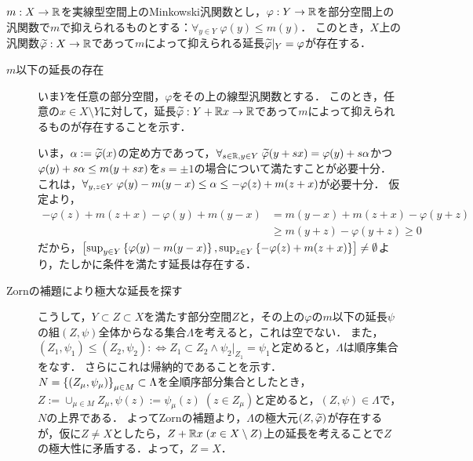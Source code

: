 \documentclass[uplatex,dvipdfmx]{jsreport}
\begin{document}
\begin{lemma}
    $m:X\to\mathbb{R}$を実線型空間上のMinkowski汎関数とし，$\varphi:Y\to\mathbb{R}$を部分空間上の汎関数で$m$で抑えられるものとする：$\forall_{y\in Y}\;\varphi(y)\le m(y)$．
    このとき，$X$上の汎関数$\widetilde{\varphi}:X\to\mathbb{R}$であって$m$によって抑えられる延長$\widetilde{\varphi}|_Y=\varphi$が存在する．
\end{lemma}
\begin{Proof}\mbox{}
    \begin{description}
        \item[$m$以下の延長の存在] いま$Y$を任意の部分空間，$\varphi$をその上の線型汎関数とする．
        このとき，任意の$x\in X\setminus Y$に対して，延長$\widetilde{\varphi}:Y+\mathbb{R} x\to\mathbb{R}$であって$m$によって抑えられるものが存在することを示す．

        いま，$\alpha:=\widetilde{\varphi}(x)$の定め方であって，$\forall_{s\in\mathbb{R},y\in Y}\;\widetilde{\varphi}(y+sx)=\varphi(y)+s\alpha$かつ$\varphi(y)+s\alpha\le m(y+sx)$を$s=\pm 1$の場合について満たすことが必要十分．
        これは，$\forall_{y,z\in Y}\;\varphi(y)-m(y-x)\le\alpha\le-\varphi(z)+m(z+x)$が必要十分．
        仮定より，
        \begin{align*}
            -\varphi(z)+m(z+x)-\varphi(y)+m(y-x)&=m(y-x)+m(z+x)-\varphi(y+z)\\
            &\ge m(y+z)-\varphi(y+z)\ge 0
        \end{align*}
        だから，$\left[\sup_{y\in Y}\left\{\varphi(y)-m(y-x)\right\},\sup_{z\in Y}\left\{-\varphi(z)+m(z+x)\right\}\right]\ne\emptyset$より，たしかに条件を満たす延長は存在する．
        \item[Zornの補題により極大な延長を探す]
        こうして，$Y\subset Z\subset X$を満たす部分空間$Z$と，その上の$\varphi$の$m$以下の延長$\psi$の組$(Z,\psi)$全体からなる集合$\Lambda$を考えると，これは空でない．
        また，$(Z_1,\psi_1)\le(Z_2,\psi_2):\Leftrightarrow Z_1\subset Z_2\land\psi_2|_{Z_1}=\psi_1$と定めると，$\Lambda$は順序集合をなす．
        さらにこれは帰納的であることを示す．
        $N=\left\{(Z_\mu,\psi_\mu)\right\}_{\mu\in M}\subset\Lambda$を全順序部分集合としたとき，$Z:=\cup_{\mu\in M}Z_\mu,\psi(z):=\psi_\mu(z)\;(z\in Z_\mu)$と定めると，$(Z,\psi)\in\Lambda$で，$N$の上界である．
        よってZornの補題より，$\Lambda$の極大元$(Z,\widetilde{\varphi})$が存在するが，仮に$Z\ne X$としたら，$Z+\mathbb{R} x\;(x\in X\setminus Z)$上の延長を考えることで$Z$の極大性に矛盾する．よって，$Z=X$．
    \end{description}
\end{Proof}
\end{document}
